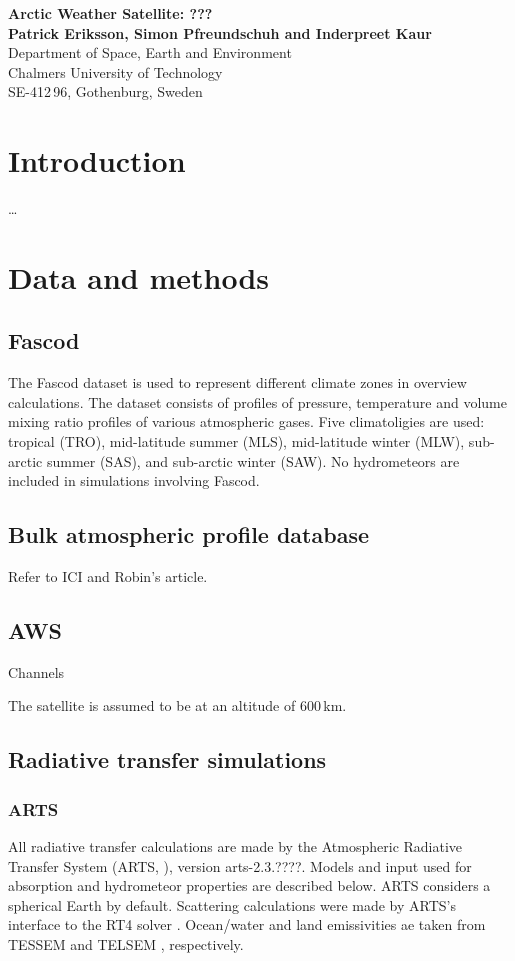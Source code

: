 \documentclass[12pt]{article}
\begin{document}
\noindent
\textbf{\Large Arctic Weather Satellite: ???}  \vspace{8mm}\\
{\bf Patrick Eriksson, Simon Pfreundschuh and Inderpreet Kaur}\\
Department of Space, Earth and Environment\\
Chalmers University of Technology\\
SE-412\,96, Gothenburg, Sweden \vspace{10mm}

\section{Introduction}
%
\dots


\section{Data and methods}


\subsection{Fascod}
%
The Fascod dataset \citep{anderson1986afgl} is used to represent different
climate zones in overview calculations. The dataset consists of profiles of
pressure, temperature and volume mixing ratio profiles of various atmospheric
gases. Five climatoligies are used: tropical (TRO), mid-latitude summer (MLS),
mid-latitude winter (MLW), sub-arctic summer (SAS), and sub-arctic winter
(SAW). No hydrometeors are included in simulations involving Fascod.


\subsection{Bulk atmospheric profile database}
%
Refer to ICI and Robin's article.


\subsection{AWS}
%
Channels

The satellite is assumed to be at an altitude of 600\,km. 


\subsection{Radiative transfer simulations}
%
\subsubsection{ARTS}
%
All radiative transfer calculations are made by the Atmospheric Radiative
Transfer System (ARTS, \citet{eriksson:arts2:11,buehler:artst:18}), version
arts-2.3.????. Models and input used for absorption and hydrometeor properties
are described below. ARTS considers a spherical Earth by default. Scattering
calculations were made by ARTS's interface to the RT4 solver
\citep{evans1995microwavec}. Ocean/water and land emissivities ae taken from
TESSEM \citet{prigent2017sea} and TELSEM \citet{aires2011tool}, respectively.
\end{document}
